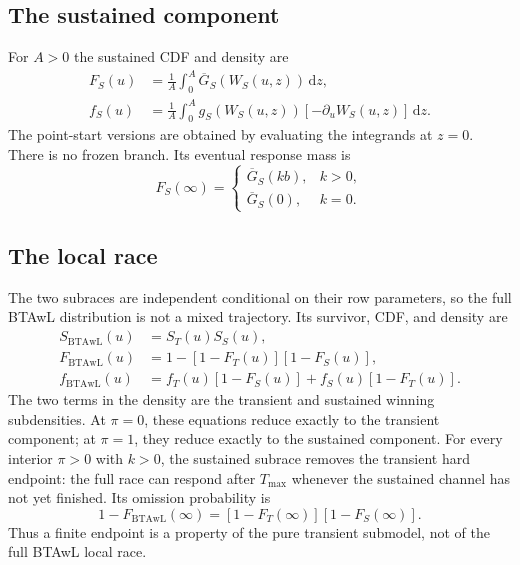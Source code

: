 \documentclass[12pt]{article}
\newcommand{\dd}{\,\mathrm{d}}
\theoremstyle{remark}
\begin{document}
\subsection{The sustained component}
For $A>0$ the sustained CDF and density are
\begin{align}
  F_S(u)&=\frac1A\int_0^A\overline G_S(W_S(u,z))\dd z,
  \label{eq:btawl-sustained-cdf}\\
  f_S(u)&=\frac1A\int_0^A
      g_S(W_S(u,z))[-\partial_uW_S(u,z)]\dd z .
  \label{eq:btawl-sustained-pdf}
\end{align}
The point-start versions are obtained by evaluating the integrands at $z=0$. There is no frozen branch.  Its eventual response mass is
\begin{equation}
  F_S(\infty)=
  \begin{cases}
    \overline G_S(kb),&k>0,\\
    \overline G_S(0),&k=0.
  \end{cases}
  \label{eq:btawl-sustained-limit}
\end{equation}

\subsection{The local race}
The two subraces are independent conditional on their row parameters, so the full BTAwL distribution is not a mixed trajectory.  Its survivor, CDF, and density are
\begin{align}
  S_{\mathrm{BTAwL}}(u)
    &=S_T(u)S_S(u),\\
  F_{\mathrm{BTAwL}}(u)
    &=1-[1-F_T(u)][1-F_S(u)],\\
  f_{\mathrm{BTAwL}}(u)
    &=f_T(u)[1-F_S(u)]+f_S(u)[1-F_T(u)].
  \label{eq:btawl-local-race}
\end{align}
The two terms in the density are the transient and sustained winning subdensities.  At $\pi=0$, these equations reduce exactly to the transient component; at $\pi=1$, they reduce exactly to the sustained component.  For every interior $\pi>0$ with $k>0$, the sustained subrace removes the transient hard endpoint: the full race can respond after $T_{\max}$ whenever the sustained channel has not yet finished.  Its omission probability is
\begin{equation}
  1-F_{\mathrm{BTAwL}}(\infty)
  =[1-F_T(\infty)][1-F_S(\infty)].
  \label{eq:btawl-local-defect}
\end{equation}
Thus a finite endpoint is a property of the pure transient submodel, not of the full BTAwL local race.
\end{document}
